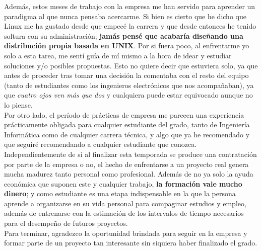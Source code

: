 \documentclass[13pt]{scrartcl}
\begin{document}
		Además, estos meses de trabajo con la empresa me han servido para aprender un paradigma al que nunca pensaba acercarme. Si bien es cierto que he dicho que Linux me ha gustado desde que empecé la carrera y que desde entonces he tenido soltura con su administración; \textbf{jamás pensé que acabaría diseñando una distribución propia basada en UNIX}. Por si fuera poco, al enfrentarme yo solo a esta tarea, me sentí guía de mí mismo a la hora de idear y estudiar soluciones y/o posibles propuestas. Esto no quiere decir que estuviera solo, ya que antes de proceder tras tomar una decisión la comentaba con el resto del equipo (tanto de estudiantes como los ingenieros electrónicos que nos acompañaban), ya que \textit{cuatro ojos ven más que dos} y cualquiera puede estar equivocado aunque no lo piense.\\
		
		Por otro lado, el período de prácticas de empresa me parecen una experiencia prácticamente obligada para cualquier estudiante del grado, tanto de Ingeniería Informática como de cualquier carrera técnica, y algo que ya he recomendado y que seguiré recomendando a cualquier estudiante que conozca. Independientemente de si al finalizar esta temporada se produce una contratación por parte de la empresa o no, el hecho de enfrentarse a un proyecto real genera mucha madurez tanto personal como profesional. Además de no ya solo la ayuda económica que suponen este y cualquier trabajo, \textbf{la formación vale mucho dinero}; y como estudiante es una etapa indispensable en la que la persona aprende a organizarse en su vida personal para compaginar estudios y empleo, además de entrenarse con la estimación de los intervalos de tiempo necesarios para el desempeño de futuros proyectos.\\
		
		Para terminar, agradezco la oportunidad brindada para seguir en la empresa y formar parte de un proyecto tan interesante sin siquiera haber finalizado el grado.
\end{document}
